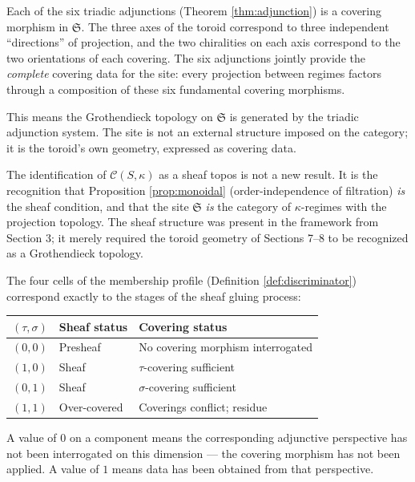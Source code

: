 \begin{remark}
Each of the six triadic adjunctions
(Theorem \ref{thm:adjunction}) is a covering morphism in
$\mathfrak{S}$. The three axes of the toroid correspond to
three independent ``directions'' of projection, and the two
chiralities on each axis correspond to the two orientations
of each covering. The six adjunctions jointly provide the
\emph{complete} covering data for the site: every
projection between regimes factors through a composition
of these six fundamental covering morphisms.

This means the Grothendieck topology on $\mathfrak{S}$ is
generated by the triadic adjunction system. The site is
not an external structure imposed on the category; it is
the toroid's own geometry, expressed as covering data.
\end{remark}

\begin{remark}
The identification of $\mathcal{C}(S,\kappa)$ as a sheaf
topos is not a new result. It is the recognition that
Proposition \ref{prop:monoidal} (order-independence of
filtration) \emph{is} the sheaf condition, and that the
site $\mathfrak{S}$ \emph{is} the category of
$\kappa$-regimes with the projection topology. The sheaf
structure was present in the framework from Section 3;
it merely required the toroid geometry of Sections 7--8
to be recognized as a Grothendieck topology.
\end{remark}

\begin{proposition}\label{prop:presheaf-sheaf}
The four cells of the membership profile
(Definition \ref{def:discriminator}) correspond exactly
to the stages of the sheaf gluing process:
\begin{center}
\begin{tabular}{c|l|l}
$(\tau, \sigma)$ & Sheaf status & Covering status \\
\hline
$(0,0)$ & Presheaf & No covering morphism interrogated \\
$(1,0)$ & Sheaf & $\tau$-covering sufficient \\
$(0,1)$ & Sheaf & $\sigma$-covering sufficient \\
$(1,1)$ & Over-covered & Coverings conflict; residue
\end{tabular}
\end{center}
A value of $0$ on a component means the corresponding
adjunctive perspective has not been interrogated on this
dimension --- the covering morphism has not been applied.
A value of $1$ means data has been obtained from that
perspective.
\end{proposition}

